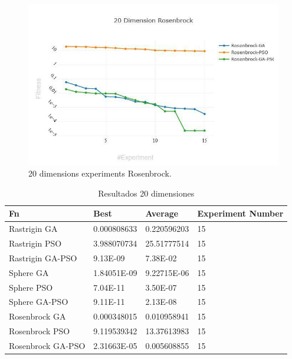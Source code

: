 \documentclass[runningheads]{llncs}
\begin{document}
                \begin{figure}[htp]
                  \includegraphics[width=\textwidth]{img/20-rosenbrock.jpg}
                  \caption{20 dimensions experiments Rosenbrock.} \label{fig1}
                  \end{figure}

                  \begin{table}[htp]

    \caption{Resultados 20 dimensiones}
    \label{table:resultados-2}
    \centering
    \begin{tabular}{|l|l|l|l|}
    \hline
    Fn & Best & Average & Experiment Number \\
    \hline
    \hline
    Rastrigin GA & 0.000808633 & 0.220596203 & 15\\
    \hline
    Rastrigin PSO & 3.988070734 & 25.51777514 & 15\\
    \hline
    Rastrigin GA-PSO & 9.13E-09 & 7.38E-02 & 15\\
    \hline
    Sphere GA & 1.84051E-09 & 9.22715E-06 & 15\\
    \hline
    Sphere PSO & 7.04E-11 & 3.50E-07 & 15\\
    \hline
    Sphere GA-PSO & 9.11E-11 & 2.13E-08 & 15\\
    \hline
    Rosenbrock GA & 0.000348015 & 0.010958941 & 15\\
    \hline
    Rosenbrock PSO & 9.119539342 & 13.37613983 & 15\\
    \hline
    Rosenbrock GA-PSO & 2.31663E-05 & 0.005608855 & 15\\
    \hline
    \end{tabular}
    \end{table}
\end{document}
